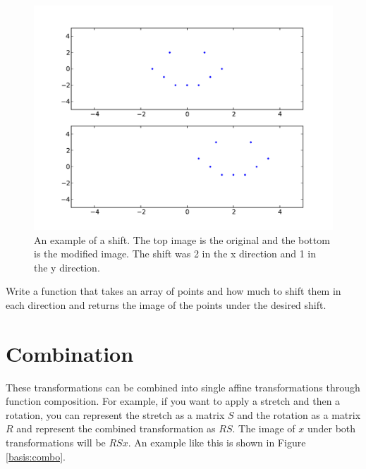 \begin{figure}
\centering
\includegraphics[width=\textwidth]{shift.pdf}
\caption{An example of a shift. The top image is the original and the bottom is the modified image. The shift was 2 in the x direction and 1 in the y direction.}
\end{figure}

\begin{problem}
Write a function that takes an array of points and how much to shift them in each direction and returns the image of the points under the desired shift.
\end{problem}

\section*{Combination}
These transformations can be combined into single affine transformations through function composition.
For example, if you want to apply a stretch and then a rotation, you can represent the stretch as a matrix $S$ and the rotation as a matrix $R$ and represent the combined transformation as $R S$.
The image of $x$ under both transformations will be $R S x$.
An example like this is shown in Figure \ref{basis:combo}.


